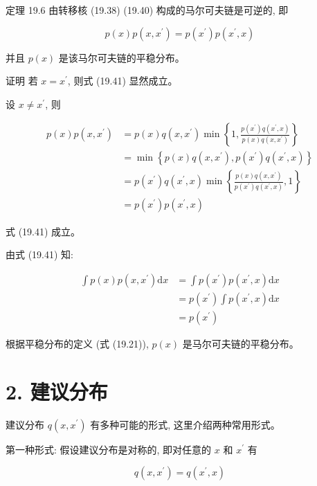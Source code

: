 \documentclass[10pt]{article}
\begin{document}
\begin{CJK*}{UTF8}{bsmi}
定理 19.6 由转移核 (19.38) (19.40) 构成的马尔可夫链是可逆的, 即


\begin{equation*}
p(x) p\left(x, x^{\prime}\right)=p\left(x^{\prime}\right) p\left(x^{\prime}, x\right) \tag{19.41}
\end{equation*}


并且 $p(x)$ 是该马尔可夫链的平稳分布。

证明 若 $x=x^{\prime}$, 则式 (19.41) 显然成立。

设 $x \neq x^{\prime}$, 则

$$
\begin{aligned}
p(x) p\left(x, x^{\prime}\right) & =p(x) q\left(x, x^{\prime}\right) \min \left\{1, \frac{p\left(x^{\prime}\right) q\left(x^{\prime}, x\right)}{p(x) q\left(x, x^{\prime}\right)}\right\} \\
& =\min \left\{p(x) q\left(x, x^{\prime}\right), p\left(x^{\prime}\right) q\left(x^{\prime}, x\right)\right\} \\
& =p\left(x^{\prime}\right) q\left(x^{\prime}, x\right) \min \left\{\frac{p(x) q\left(x, x^{\prime}\right)}{p\left(x^{\prime}\right) q\left(x^{\prime}, x\right)}, 1\right\} \\
& =p\left(x^{\prime}\right) p\left(x^{\prime}, x\right)
\end{aligned}
$$

式 (19.41) 成立。

由式 (19.41) 知:

$$
\begin{aligned}
\int p(x) p\left(x, x^{\prime}\right) \mathrm{d} x & =\int p\left(x^{\prime}\right) p\left(x^{\prime}, x\right) \mathrm{d} x \\
& =p\left(x^{\prime}\right) \int p\left(x^{\prime}, x\right) \mathrm{d} x \\
& =p\left(x^{\prime}\right)
\end{aligned}
$$

根据平稳分布的定义 (式 (19.21)), $p(x)$ 是马尔可夫链的平稳分布。

\section*{2. 建议分布}
建议分布 $q\left(x, x^{\prime}\right)$ 有多种可能的形式, 这里介绍两种常用形式。

第一种形式: 假设建议分布是对称的, 即对任意的 $x$ 和 $x^{\prime}$ 有


\begin{equation*}
q\left(x, x^{\prime}\right)=q\left(x^{\prime}, x\right) \tag{19.42}
\end{equation*}



\end{CJK*}
\end{document}
